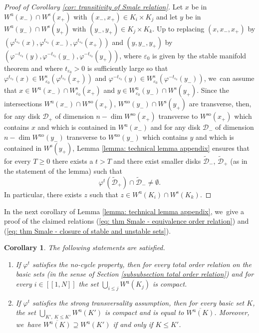 \documentclass[JEP,XML,SOM,Unicode,NoEqCountersInSection,NoFloatCountersInSection,published]{cedram}
\newcommand{\lcr}{[\![}
\newcommand{\rcr}{]\!]}
\newcommand{\rs}{\mathrm{s}}
\newcommand{\rso}{\mathrm{so}}
\newcommand{\ru}{\mathrm{u}}
\newcommand{\ruo}{\mathrm{uo}}
\theoremstyle{definition}
\theoremstyle{plain}
\newtheorem{corollary}[definition]{Corollary}
\newcommand{\D}{\mathcal{D}}
\begin{document}
\begin{appendix}
\begin{proof}[Proof of Corollary \ref{cor: transitivity of Smale relation}]
Let $x$ be in $W^\ru (x_-) \cap W^\rs (x_+)$ with $(x_-,x_+) \in K_i \times K_j$ and let $y$ be in $W^\ru (y_-) \cap W^\rs (y_+)$ with $(y_-,y_+) \in K_j \times K_k$. Up to replacing $(x,x_-,x_+)$ by $(\varphi^{t_{\varepsilon_0}}(x), \varphi^{t_{\varepsilon_0}} (x_-), \varphi^{t_{\varepsilon_0}}(x_+))$ and $(y,y_-,y_+)$ by $(\varphi^{-t_{\varepsilon_0}}(y), \varphi^{-t_{\varepsilon_0}} (y_-), \varphi^{-t_{\varepsilon_0}}(y_+))$, where $\varepsilon_0$ is given by the stable manifold theorem and where $t_{\varepsilon_0} > 0$ is sufficiently large so that $\varphi^{t_{\varepsilon_0}}(x) \in W_{\varepsilon_0}^\rs (\varphi^{t_{\varepsilon_0}}(x_+))$ and $\varphi^{-t_{\varepsilon_0}}(y) \in W_{\varepsilon_0}^\rs (\varphi^{-t_{\varepsilon_0}}(y_-))$, we~can assume that $x \in W^\ru (x_-) \cap W_{\varepsilon_0}^\rs (x_+)$ and $y \in W_{\varepsilon_0}^\ru (y_-) \cap W^\rs (y_+)$. Since the intersections $W^{\ru} (x_-) \cap W^{\rso} (x_+)$, $W^{\ruo} (y_-) \cap W^{\rs} (y_+)$ are transverse, then, for any disk $\D_{+}$ of dimension $n - \dim W^{\rso} (x_+)$ transverse to $W^{\rso} (x_+)$ which contains $x$ and which is contained in $W^{\ru} (x_-)$ and for any disk $\D_{-}$ of dimension $n - \dim W^{\ruo} (y_-)$ transverse to $W^{\ruo} (y_-)$ which contains $y$ and which is contained in $W^{\rs} (y_+)$, Lemma \ref{lemma: technical lemma appendix} ensures that for every $T \geq 0$ there exists a $t > T$ and there exist smaller disks $\widetilde{\D}_-$, $\widetilde{\D}_+$ (as in the statement of the lemma) such that
\[
\varphi^t (\widetilde{\D}_{+}) \cap \widetilde{\D}_{-} \neq \emptyset.
\]
In particular, there exists $z$ such that $z \in W^{\ru} (K_i) \cap W^{\rs}(K_k)$.
\end{proof}

In the next corollary of Lemma \ref{lemma: technical lemma appendix}, we~give a proof of the claimed relations (\ref{eq: thm Smale - equivalence order relation}) and (\ref{eq: thm Smale - closure of stable and unstable sets}).

\begin{corollary}\label{cor: corollary technical lemma - closure of unstable sets} The following statements are satisfied.
\begin{enumerate}
\item\label{cor: corollary technical lemma - closure of unstable sets1} If $\varphi^t$ satisfies the no-cycle property, then for every total order relation on the basic sets (in the sense of Section \ref{subsubsection total order relation}) and for every $i\in\lcr1,N\rcr$ the set $\bigcup_{i \leq j}\!W^\ru (K_j)$ is compact.
\item\label{cor: corollary technical lemma - closure of unstable sets2} If $\varphi^t$ satisfies the strong transversality assumption, then for every basic set $K$, the set $\bigcup_{K', \: K \leq K'} W^\ru (K')$ is compact and is equal to $\overline{W^\ru (K)}$. Moreover, we~have $\overline{W^\ru (K)} \supseteq W^\ru (K')$ if and only if $K \leq K'$.
\end{enumerate}
\end{corollary}


\end{appendix}
\end{document}
